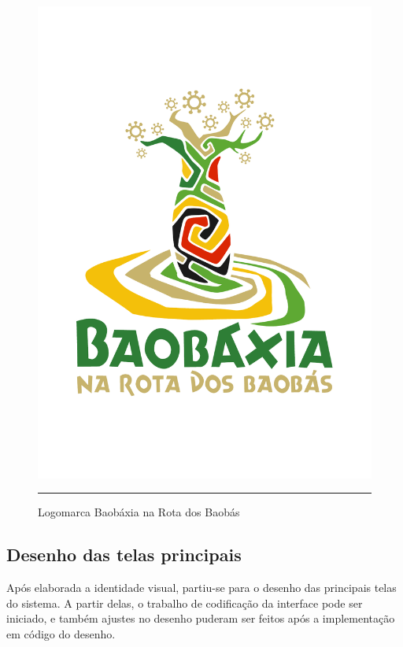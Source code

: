 \begin{figure}[htbp]
  \centering
  \includegraphics[width=\textwidth]{./Fig/Logo_BBX_Na_Rota.pdf}
  \rule{35em}{0.5pt}
  \caption[Logomarca Baobáxia na Rota dos Baobás]{
    Logomarca Baobáxia na Rota dos Baobás}
  \label{fig:Logo_BBX_Na_Rota}
\end{figure}

\subsection{Desenho das telas principais}

Após elaborada a identidade visual, partiu-se para o desenho das
principais telas do sistema. A partir delas, o trabalho de codificação
da interface pode ser iniciado, e também ajustes no desenho puderam ser
feitos após a implementação em código do desenho.

